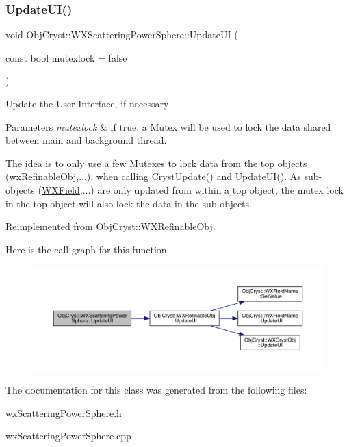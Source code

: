 \subsubsection{\texorpdfstring{UpdateUI()}{UpdateUI()}}
{\footnotesize\ttfamily void Obj\+Cryst\+::\+W\+X\+Scattering\+Power\+Sphere\+::\+Update\+UI (\begin{DoxyParamCaption}\item[{const bool}]{mutexlock = {\ttfamily false} }\end{DoxyParamCaption})\hspace{0.3cm}{\ttfamily [virtual]}}

Update the User Interface, if necessary


\begin{DoxyParams}{Parameters}
{\em mutexlock} & if true, a Mutex will be used to lock the data shared between main and background thread.\\
\hline
\end{DoxyParams}
The idea is to only use a few Mutexes to lock data from the top objects (wx\+Refinable\+Obj,...), when calling \mbox{\hyperlink{class_obj_cryst_1_1_w_x_refinable_obj_a8249d288e62ad1ebffeea91f77ae37a3}{Cryst\+Update()}} and \mbox{\hyperlink{class_obj_cryst_1_1_w_x_scattering_power_sphere_a2e1eed3ea3e179e57621251cc844be3e}{Update\+U\+I()}}. As sub-\/objects (\mbox{\hyperlink{class_obj_cryst_1_1_w_x_field}{W\+X\+Field}},...) are only updated from within a top object, the mutex lock in the top object will also lock the data in the sub-\/objects. 

Reimplemented from \mbox{\hyperlink{class_obj_cryst_1_1_w_x_refinable_obj_acbf70975a79661a73a1ae3c39c9c3045}{Obj\+Cryst\+::\+W\+X\+Refinable\+Obj}}.

Here is the call graph for this function\+:
\nopagebreak
\begin{figure}[H]
\begin{center}
\leavevmode
\includegraphics[width=350pt]{class_obj_cryst_1_1_w_x_scattering_power_sphere_a2e1eed3ea3e179e57621251cc844be3e_cgraph}
\end{center}
\end{figure}


The documentation for this class was generated from the following files\+:\begin{DoxyCompactItemize}
\item 
wx\+Scattering\+Power\+Sphere.\+h\item 
wx\+Scattering\+Power\+Sphere.\+cpp\end{DoxyCompactItemize}
